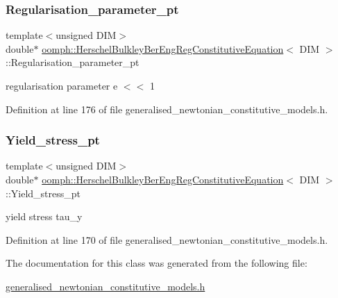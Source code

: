 \subsubsection{\texorpdfstring{Regularisation\+\_\+parameter\+\_\+pt}{Regularisation\_parameter\_pt}}
{\footnotesize\ttfamily template$<$unsigned D\+IM$>$ \\
double$\ast$ \hyperlink{classoomph_1_1HerschelBulkleyBerEngRegConstitutiveEquation}{oomph\+::\+Herschel\+Bulkley\+Ber\+Eng\+Reg\+Constitutive\+Equation}$<$ D\+IM $>$\+::Regularisation\+\_\+parameter\+\_\+pt\hspace{0.3cm}{\ttfamily [private]}}



regularisation parameter e $<$$<$ 1 



Definition at line 176 of file generalised\+\_\+newtonian\+\_\+constitutive\+\_\+models.\+h.

\mbox{\label{classoomph_1_1HerschelBulkleyBerEngRegConstitutiveEquation_a34fcbd9d7a01ec046749e3b2ca4ef0b8}} 
\subsubsection{\texorpdfstring{Yield\+\_\+stress\+\_\+pt}{Yield\_stress\_pt}}
{\footnotesize\ttfamily template$<$unsigned D\+IM$>$ \\
double$\ast$ \hyperlink{classoomph_1_1HerschelBulkleyBerEngRegConstitutiveEquation}{oomph\+::\+Herschel\+Bulkley\+Ber\+Eng\+Reg\+Constitutive\+Equation}$<$ D\+IM $>$\+::Yield\+\_\+stress\+\_\+pt\hspace{0.3cm}{\ttfamily [private]}}



yield stress tau\+\_\+y 



Definition at line 170 of file generalised\+\_\+newtonian\+\_\+constitutive\+\_\+models.\+h.



The documentation for this class was generated from the following file\+:\begin{DoxyCompactItemize}
\item 
\hyperlink{generalised__newtonian__constitutive__models_8h}{generalised\+\_\+newtonian\+\_\+constitutive\+\_\+models.\+h}\end{DoxyCompactItemize}
